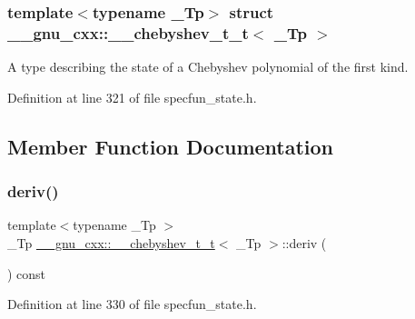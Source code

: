 \subsubsection*{template$<$typename \+\_\+\+Tp$>$\newline
struct \+\_\+\+\_\+gnu\+\_\+cxx\+::\+\_\+\+\_\+chebyshev\+\_\+t\+\_\+t$<$ \+\_\+\+Tp $>$}

A type describing the state of a Chebyshev polynomial of the first kind. 

Definition at line 321 of file specfun\+\_\+state.\+h.



\subsection{Member Function Documentation}
\mbox{\label{struct____gnu__cxx_1_1____chebyshev__t__t_a56cbd3597ee48e612b596c9982d23e79}} 
\subsubsection{\texorpdfstring{deriv()}{deriv()}}
{\footnotesize\ttfamily template$<$typename \+\_\+\+Tp $>$ \\
\+\_\+\+Tp \hyperlink{struct____gnu__cxx_1_1____chebyshev__t__t}{\+\_\+\+\_\+gnu\+\_\+cxx\+::\+\_\+\+\_\+chebyshev\+\_\+t\+\_\+t}$<$ \+\_\+\+Tp $>$\+::deriv (\begin{DoxyParamCaption}{ }\end{DoxyParamCaption}) const\hspace{0.3cm}{\ttfamily [inline]}}



Definition at line 330 of file specfun\+\_\+state.\+h.

\mbox{\label{struct____gnu__cxx_1_1____chebyshev__t__t_a7b8086b8c304f7cca7cd971c7be8c2c5}} 

